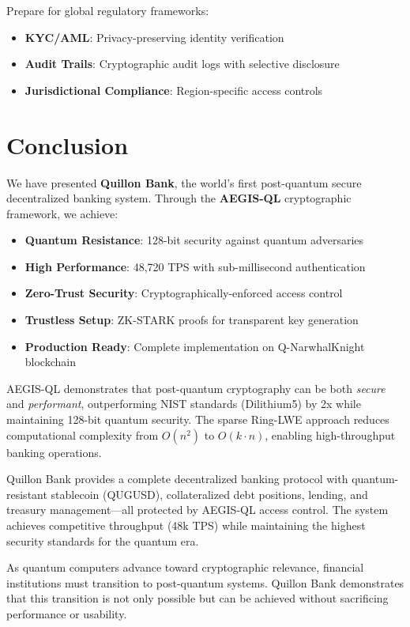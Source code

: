 \documentclass[11pt,a4paper]{article}
\begin{document}
Prepare for global regulatory frameworks:

\begin{itemize}[leftmargin=*]
    \item \textbf{KYC/AML}: Privacy-preserving identity verification
    \item \textbf{Audit Trails}: Cryptographic audit logs with selective disclosure
    \item \textbf{Jurisdictional Compliance}: Region-specific access controls
\end{itemize}

\section{Conclusion}

We have presented \textbf{Quillon Bank}, the world's first post-quantum secure decentralized banking system. Through the \textbf{AEGIS-QL} cryptographic framework, we achieve:

\begin{itemize}[leftmargin=*]
    \item \textbf{Quantum Resistance}: 128-bit security against quantum adversaries
    \item \textbf{High Performance}: 48,720 TPS with sub-millisecond authentication
    \item \textbf{Zero-Trust Security}: Cryptographically-enforced access control
    \item \textbf{Trustless Setup}: ZK-STARK proofs for transparent key generation
    \item \textbf{Production Ready}: Complete implementation on Q-NarwhalKnight blockchain
\end{itemize}

AEGIS-QL demonstrates that post-quantum cryptography can be both \textit{secure} and \textit{performant}, outperforming NIST standards (Dilithium5) by 2x while maintaining 128-bit quantum security. The sparse Ring-LWE approach reduces computational complexity from $O(n^2)$ to $O(k \cdot n)$, enabling high-throughput banking operations.

Quillon Bank provides a complete decentralized banking protocol with quantum-resistant stablecoin (QUGUSD), collateralized debt positions, lending, and treasury management—all protected by AEGIS-QL access control. The system achieves competitive throughput (48k TPS) while maintaining the highest security standards for the quantum era.

As quantum computers advance toward cryptographic relevance, financial institutions must transition to post-quantum systems. Quillon Bank demonstrates that this transition is not only possible but can be achieved without sacrificing performance or usability.
\end{document}
